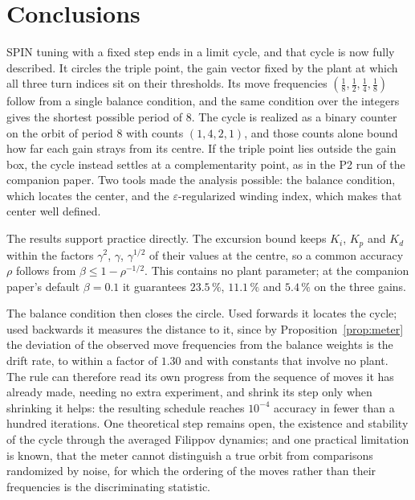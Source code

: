 \documentclass[letterpaper, 10pt, conference, twocolumn]{ieeeconf}
\begin{document}
\section{Conclusions}

SPIN tuning with a fixed step ends in a limit cycle, and that cycle is now
fully described. It circles the triple point, the gain vector fixed by the
plant at which all three turn indices sit on their thresholds. Its move
frequencies $(\tfrac18, \tfrac12, \tfrac14, \tfrac18)$ follow from a single
balance condition, and the same condition over the integers gives the shortest
possible period of $8$. The cycle is realized as a binary counter on the
orbit of period $8$ with counts $(1,4,2,1)$, and those counts alone bound how
far each gain strays from its centre. If the
triple point lies outside the gain box, the cycle instead settles at a
complementarity point, as in the P2 run of the companion paper. Two tools made
the analysis possible: the balance condition, which locates the center, and the
$\varepsilon$-regularized winding index, which makes that center well defined.

The results support practice directly. The excursion bound keeps $K_i$, $K_p$
and $K_d$ within the factors $\gamma^{2}$, $\gamma$, $\gamma^{1/2}$ of their
values at the centre, so a common accuracy $\rho$ follows from
$\beta \le 1-\rho^{-1/2}$. This contains no plant parameter; at the companion
paper's default $\beta = 0.1$ it guarantees $23.5\,\%$, $11.1\,\%$ and
$5.4\,\%$ on the three gains.

The balance condition then closes the circle. Used forwards it locates the
cycle; used backwards it measures the distance to it, since by
Proposition~\ref{prop:meter} the deviation of the observed move frequencies
from the balance weights is the drift rate, to within a factor of $1.30$ and
with constants that involve no plant. The rule can therefore read its own
progress from the sequence of moves it has already made, needing no extra
experiment, and shrink its step only when shrinking it helps: the resulting
schedule reaches $10^{-4}$ accuracy in fewer than a hundred iterations. One
theoretical step remains open, the existence and stability of the cycle
through the averaged Filippov dynamics; and one practical limitation is known,
that the meter cannot distinguish a true orbit from comparisons randomized by
noise, for which the ordering of the moves rather than their frequencies is
the discriminating statistic.
\end{document}

